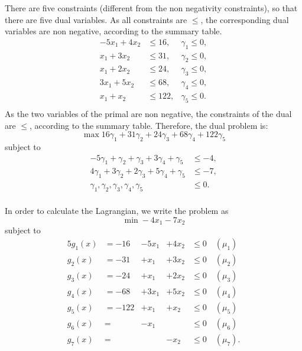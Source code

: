
 There are five constraints (different from the non negativity
 constraints), so that there are five dual variables. As all
 constraints are $\leq$, the corresponding dual variables are non negative, according to the
 summary table.
 \begin{align*}
 -5x_1 + 4x_2 &\leq 16, & \gamma_1 \leq 0, \\
x_1 + 3x_2 &\leq 31, &\gamma_2 \leq 0,\\
x_1 + 2x_2 &\leq 24, &\gamma_3 \leq 0,\\
3x_1 +5x_2&\leq  68, &\gamma_4 \leq 0,\\
x_1 + x_2&\leq 122, & \gamma_5 \leq 0.\\
 \end{align*}
As the two variables of the primal are non negative, the constraints
of the dual are $\leq$, according to the summary table. Therefore,  the dual problem is:
\begin{equation}
  \label{eq:dual2}
\max  16\gamma_1 + 31\gamma_2 + 24\gamma_3 + 68\gamma_4 + 122\gamma_5
\end{equation}
subject to
\begin{equation}
  \label{eq:dual2c}
\begin{aligned}
-5\gamma_1 + \gamma_2 + \gamma_3 + 3\gamma_4 + \gamma_5 &\leq -4, \\
4\gamma_1 + 3\gamma_2 + 2\gamma_3 + 5\gamma_4 + \gamma_5 &\leq -7, \\
\gamma_1,\gamma_2,\gamma_3,\gamma_4,\gamma_5 &\leq 0. \\
\end{aligned}
\end{equation}

In order to calculate the Lagrangian, we 
 write the problem as $$\min -4x_1-7x_2$$ subject to 
\begin{alignat*}{5}
g_1(x) &= -16 & -5x_1 & +4x_2 & \leq 0 \quad (\mu_1)\\
g_2(x) &= -31 & +x_1 & +3x_2  & \leq 0 \quad (\mu_2)\\
g_3(x) &= -24 & +x_1 &+2x_2 & \leq 0 \quad (\mu_3)\\
g_4(x) &= -68 & +3x_1 & +5x_2 & \leq 0 \quad (\mu_4)\\
g_5(x) &= -122 & +x_1 & +x_2 & \leq 0 \quad (\mu_5)\\
g_6(x) &= & -x_1 &  & \leq 0 \quad (\mu_6)\\
g_7(x) &= & & -x_2  & \leq 0 \quad (\mu_7).
\end{alignat*}


